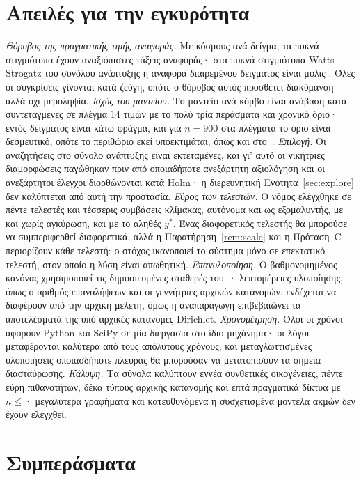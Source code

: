 \documentclass[11pt,a4paper]{article}
\theoremstyle{definition}
\theoremstyle{plain}
\begin{document}
\section{Απειλές για την εγκυρότητα}\label{sec:limitations}

\emph{Θόρυβος της πραγματικής τιμής αναφοράς.} Με \MGTsp{} κόσμους ανά δείγμα, τα πυκνά στιγμιότυπα έχουν αναξιόπιστες τάξεις αναφοράς· στα πυκνά στιγμιότυπα Watts--Strogatz του συνόλου ανάπτυξης η αναφορά διαιρεμένου δείγματος είναι μόλις \WSDenseCeiling. Όλες οι συγκρίσεις γίνονται κατά ζεύγη, οπότε ο θόρυβος αυτός προσθέτει διακύμανση αλλά όχι μεροληψία. \emph{Ισχύς του μαντείου.} Το μαντείο ανά κόμβο είναι ανάβαση κατά συντεταγμένες σε πλέγμα 14 τιμών με το πολύ τρία περάσματα και χρονικό όριο· εντός δείγματος είναι κάτω φράγμα, και για $n=900$ στα πλέγματα το όριο είναι δεσμευτικό, οπότε το περιθώριο εκεί υποεκτιμάται, όπως και στο~\cite{konstantellos26}. \emph{Επιλογή.} Οι αναζητήσεις στο σύνολο ανάπτυξης είναι εκτεταμένες, και γι' αυτό οι νικήτριες διαμορφώσεις παγώθηκαν πριν από οποιαδήποτε ανεξάρτητη αξιολόγηση και οι ανεξάρτητοι έλεγχοι διορθώνονται κατά Holm· η διερευνητική Ενότητα~\ref{sec:explore} δεν καλύπτεται από αυτή την προστασία. \emph{Εύρος των τελεστών.} Ο νόμος ελέγχθηκε σε πέντε τελεστές και τέσσερις συμβάσεις κλίμακας, αυτόνομα και ως εξομαλυντής, με και χωρίς αγκύρωση, και με το αληθές $y^*$. Ένας διαφορετικός τελεστής θα μπορούσε να συμπεριφερθεί διαφορετικά, αλλά η Παρατήρηση~\ref{rem:scale} και η Πρόταση~C περιορίζουν κάθε τελεστή: ο στόχος ικανοποιεί το σύστημα μόνο σε επεκτατικό τελεστή, στον οποίο η λύση είναι απωθητική. \emph{Επανυλοποίηση.} Ο βαθμονομημένος κανόνας χρησιμοποιεί τις δημοσιευμένες σταθερές του~\cite{konstantellos26}· λεπτομέρειες υλοποίησης, όπως ο αριθμός επαναλήψεων και οι γεννήτριες αρχικών κατανομών, ενδέχεται να διαφέρουν από την αρχική μελέτη, όμως η αναπαραγωγή επιβεβαιώνει τα αποτελέσματά της υπό αρχικές κατανομές Dirichlet. \emph{Χρονομέτρηση.} Όλοι οι χρόνοι αφορούν Python και SciPy σε μία διεργασία στο ίδιο μηχάνημα· οι λόγοι μεταφέρονται καλύτερα από τους απόλυτους χρόνους, και μεταγλωττισμένες υλοποιήσεις οποιασδήποτε πλευράς θα μπορούσαν να μετατοπίσουν τα σημεία διασταύρωσης. \emph{Κάλυψη.} Τα σύνολα καλύπτουν εννέα συνθετικές οικογένειες, πέντε εύρη πιθανοτήτων, δέκα τύπους αρχικής κατανομής και επτά πραγματικά δίκτυα με $n\le{}$\SweepNmax{}· μεγαλύτερα γραφήματα και κατευθυνόμενα ή συσχετισμένα μοντέλα ακμών δεν έχουν ελεγχθεί.

\section{Συμπεράσματα}\label{sec:conclusion}
\end{document}
